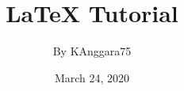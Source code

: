 \documentclass[12pt]{book}
\begin{document}
\title{\Large{\textbf{LaTeX Tutorial}}}

\author{By KAnggara75}

\date{March 24, 2020}

\maketitle
\end{document}
